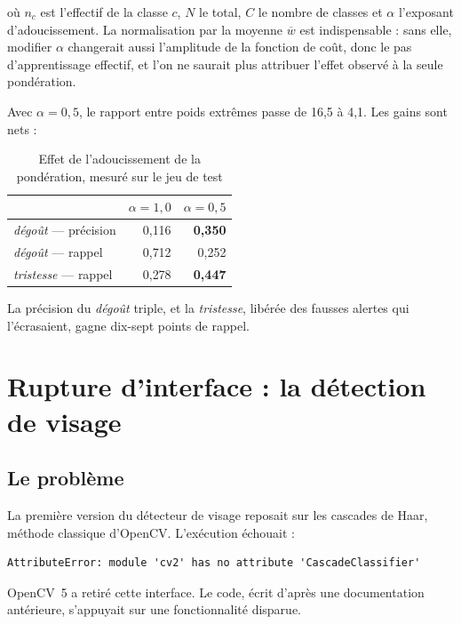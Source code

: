 \documentclass[a4paper,12pt]{report}
\begin{document}
où $n_c$ est l'effectif de la classe $c$, $N$ le total, $C$ le nombre de classes
et $\alpha$ l'exposant d'adoucissement. La normalisation par la moyenne
$\overline{w}$ est indispensable : sans elle, modifier $\alpha$ changerait
aussi l'amplitude de la fonction de coût, donc le pas d'apprentissage effectif,
et l'on ne saurait plus attribuer l'effet observé à la seule pondération.

Avec $\alpha = 0{,}5$, le rapport entre poids extrêmes passe de 16{,}5 à 4{,}1.
Les gains sont nets :

\begin{table}[htbp]
\centering
\caption{Effet de l'adoucissement de la pondération, mesuré sur le jeu de test}
\label{tab:ponderation}
\begin{tabularx}{\textwidth}{|>{\raggedright\arraybackslash}X|r|r|}
\hline
 & $\alpha = 1{,}0$ & $\alpha = 0{,}5$ \\
\hline
\emph{dégoût} --- précision   & 0{,}116 & \textbf{0{,}350} \\
\emph{dégoût} --- rappel      & 0{,}712 & 0{,}252 \\
\emph{tristesse} --- rappel   & 0{,}278 & \textbf{0{,}447} \\
\hline
\end{tabularx}
\end{table}

La précision du \emph{dégoût} triple, et la \emph{tristesse}, libérée des
fausses alertes qui l'écrasaient, gagne dix-sept points de rappel.

\section{Rupture d'interface : la détection de visage}
\label{sec:diff:opencv}

\subsection*{Le problème}
La première version du détecteur de visage reposait sur les cascades de Haar,
méthode classique d'OpenCV. L'exécution échouait :

\begin{lstlisting}[basicstyle=\ttfamily\small,frame=single,backgroundcolor=\color{black!3}]
AttributeError: module 'cv2' has no attribute 'CascadeClassifier'
\end{lstlisting}

OpenCV~5 a retiré cette interface. Le code, écrit d'après une documentation
antérieure, s'appuyait sur une fonctionnalité disparue.
\end{document}
